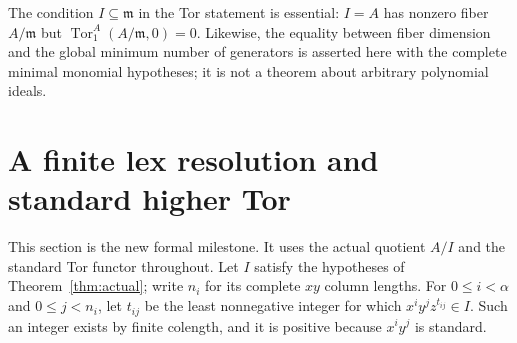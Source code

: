 \documentclass[11pt,a4paper]{article}
\begin{document}
The condition $I\subseteq\mathfrak m$ in the Tor statement is essential:
$I=A$ has nonzero fiber $A/\mathfrak m$ but
$\operatorname{Tor}_1^A(A/\mathfrak m,0)=0$.
Likewise, the equality between fiber dimension and the global minimum number
of generators is asserted here with the complete minimal monomial hypotheses;
it is not a theorem about arbitrary polynomial ideals.

\section{A finite lex resolution and standard higher Tor}\label{sec:higher}
This section is the new formal milestone. It uses the actual quotient $A/I$
and the standard Tor functor throughout. Let $I$ satisfy the hypotheses of
Theorem~\ref{thm:actual}; write $n_i$ for its complete $xy$ column lengths.
For $0\le i<\alpha$ and $0\le j<n_i$, let $t_{ij}$ be the least nonnegative
integer for which $x^iy^jz^{t_{ij}}\in I$. Such an integer exists by finite
colength, and it is positive because $x^iy^j$ is standard.
\end{document}
